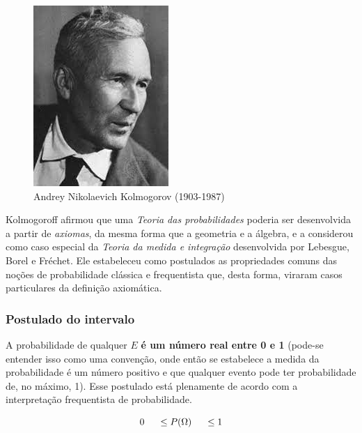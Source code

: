 \documentclass[
]{book}
\begin{document}
\hfill\break

\begin{figure}

{\centering \includegraphics[width=0.4\linewidth]{images4/kolmogorov} 

}

\caption{Andrey Nikolaevich Kolmogorov  (1903-1987)}\label{fig:unnamed-chunk-62}
\end{figure}

\hfill\break

Kolmogoroff afirmou que uma \emph{Teoria das probabilidades} poderia ser desenvolvida a partir de \emph{axiomas}, da
mesma forma que a geometria e a álgebra, e a considerou como caso especial da \emph{Teoria da medida e integração} desenvolvida por Lebesgue, Borel e Fréchet. Ele estabeleceu como postulados as propriedades comuns das noções de probabilidade clássica e frequentista que, desta forma, viraram casos particulares da definição axiomática.

\hfill\break

\hypertarget{postulado-do-intervalo}{%
\subsubsection{Postulado do intervalo}\label{postulado-do-intervalo}}

A probabilidade de qualquer \(E\) \textbf{é um número real entre 0 e 1} (pode-se entender isso como uma convenção, onde então se estabelece a medida da probabilidade é um número positivo e que qualquer evento pode ter probabilidade de, no máximo, 1). Esse postulado está plenamente de acordo com a interpretação frequentista de probabilidade.

\hfill\break

\[
0 \hspace{0.5cm} \le P(\Omega) \hspace{0.5cm} \le 1
\]
\end{document}
